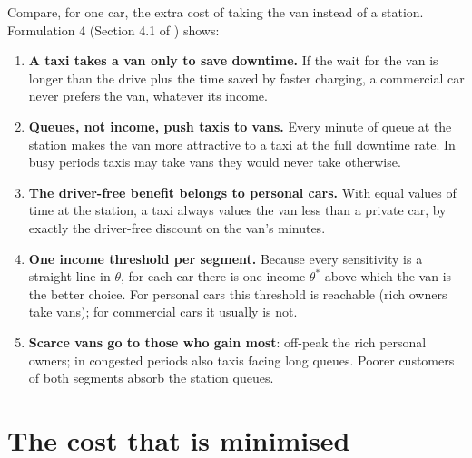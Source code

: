 Compare, for one car, the extra cost of taking the van instead of a station. Formulation 4 (Section 4.1 of ) shows:
\begin{enumerate}
  \item \textbf{A taxi takes a van only to save downtime.} If the wait for the van is longer than the drive plus the time saved by faster charging, a commercial car never prefers the van, whatever its income.
  \item \textbf{Queues, not income, push taxis to vans.} Every minute of queue at the station makes the van more attractive to a taxi at the full downtime rate. In busy periods taxis may take vans they would never take otherwise.
  \item \textbf{The driver-free benefit belongs to personal cars.} With equal values of time at the station, a taxi always values the van less than a private car, by exactly the driver-free discount on the van's minutes.
  \item \textbf{One income threshold per segment.} Because every sensitivity is a straight line in $\theta$, for each car there is one income $\theta^*$ above which the van is the better choice. For personal cars this threshold is reachable (rich owners take vans); for commercial cars it usually is not.
  \item \textbf{Scarce vans go to those who gain most}: off-peak the rich personal owners; in congested periods also taxis facing long queues. Poorer customers of both segments absorb the station queues.
\end{enumerate}


\section{The cost that is minimised}
\label{sec:Z}

